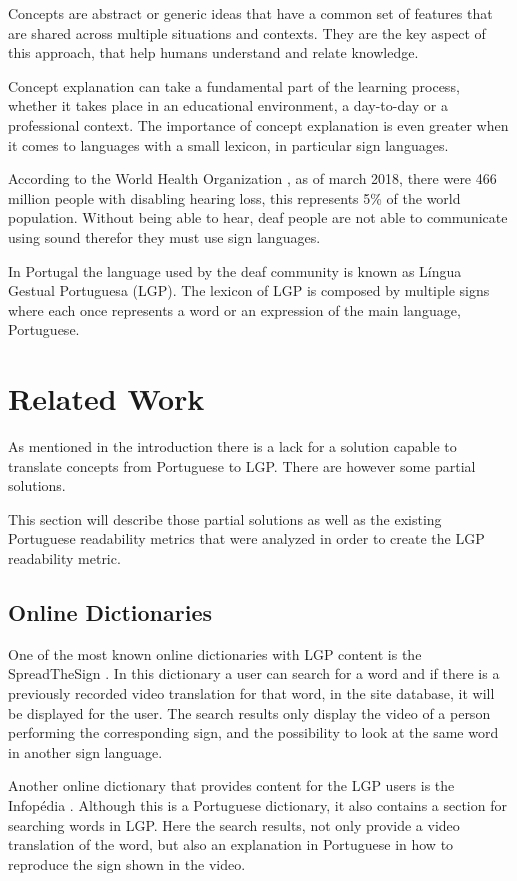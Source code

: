 \documentclass[runningheads]{llncs}
\begin{document}
Concepts are abstract or generic ideas that have a common set of features that are shared across multiple situations and contexts.
They are the key aspect of this approach, that help humans understand and relate knowledge.

Concept explanation can take a fundamental part of the learning process, whether it takes place in an educational environment, a day-to-day or a professional context.
The importance of concept explanation is even greater when it comes to languages with a small lexicon, in particular sign languages.

According to the World Health Organization \cite{who_2020}, as of march 2018, there were 466 million people with disabling hearing loss, this represents 5\% of the world population.
Without being able to hear, deaf people are not able to communicate using sound therefor they must use sign languages.

In Portugal the language used by the deaf community is known as Língua Gestual Portuguesa (LGP).
The lexicon of LGP is composed by multiple signs where each once represents a word or an expression of the main language, Portuguese.

\section{Related Work}

As mentioned in the introduction there is a lack for a solution capable to translate concepts from Portuguese to LGP.
There are however some partial solutions.

This section will describe those partial solutions as well as the existing Portuguese readability metrics that were analyzed in order to create the LGP readability metric.

\subsection{Online Dictionaries}

One of the most known online dictionaries with LGP content is the SpreadTheSign \cite{sts_2020}.
In this dictionary a user can search for a word and if there is a previously recorded video translation for that word, in the site database, it will be displayed for the user.
The search results only display the video of a person performing the corresponding sign, and the possibility to look at the same word in another sign language.

Another online dictionary that provides content for the LGP users is the Infopédia \cite{infopedia_2020}.
Although this is a Portuguese dictionary, it also contains a section for searching words in LGP.
Here the search results, not only provide a video translation of the word, but also an explanation in Portuguese in how to reproduce the sign shown in the video.
\end{document}
